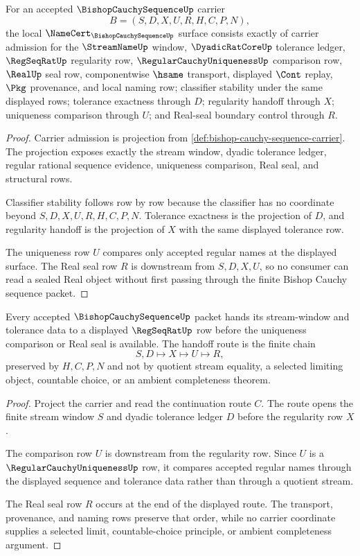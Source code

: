 \begin{theorem}
\label{thm:bishop-cauchy-sequence-namecert-obligations}
For an accepted $\BishopCauchySequenceUp$ carrier
$$
B=(S,D,X,U,R,H,C,P,N),
$$
the local $\NameCert_{\BishopCauchySequenceUp}$ surface consists exactly of carrier admission for the $\StreamNameUp$ window, $\DyadicRatCoreUp$ tolerance ledger, $\RegSeqRatUp$ regularity row, $\RegularCauchyUniquenessUp$ comparison row, $\RealUp$ seal row, componentwise $\hsame$ transport, displayed $\Cont$ replay, $\Pkg$ provenance, and local naming row; classifier stability under the same displayed rows; tolerance exactness through $D$; regularity handoff through $X$; uniqueness comparison through $U$; and Real-seal boundary control through $R$.
\end{theorem}
\begin{proof}
Carrier admission is projection from \autoref{def:bishop-cauchy-sequence-carrier}. The projection exposes exactly the stream window, dyadic tolerance ledger, regular rational sequence evidence, uniqueness comparison, Real seal, and structural rows.

Classifier stability follows row by row because the classifier has no coordinate beyond $S,D,X,U,R,H,C,P,N$. Tolerance exactness is the projection of $D$, and regularity handoff is the projection of $X$ with the same displayed tolerance row.

The uniqueness row $U$ compares only accepted regular names at the displayed surface. The Real seal row $R$ is downstream from $S,D,X,U$, so no consumer can read a sealed Real object without first passing through the finite Bishop Cauchy sequence packet.
\end{proof}

\begin{theorem}
\label{thm:bishop-cauchy-sequence-regularity-handoff}
Every accepted $\BishopCauchySequenceUp$ packet hands its stream-window and tolerance data to a displayed $\RegSeqRatUp$ row before the uniqueness comparison or Real seal is available. The handoff route is the finite chain
$$
S,D \longmapsto X \longmapsto U \longmapsto R ,
$$
preserved by $H,C,P,N$ and not by quotient stream equality, a selected limiting object, countable choice, or an ambient completeness theorem.
\end{theorem}
\begin{proof}
Project the carrier and read the continuation route $C$. The route opens the finite stream window $S$ and dyadic tolerance ledger $D$ before the regularity row $X$.

The comparison row $U$ is downstream from the regularity row. Since $U$ is a $\RegularCauchyUniquenessUp$ row, it compares accepted regular names through the displayed sequence and tolerance data rather than through a quotient stream.

The Real seal row $R$ occurs at the end of the displayed route. The transport, provenance, and naming rows preserve that order, while no carrier coordinate supplies a selected limit, countable-choice principle, or ambient completeness argument.
\end{proof}

